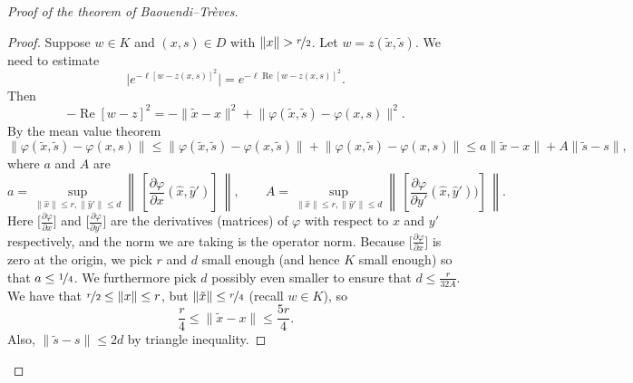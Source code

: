 \documentclass[12pt,openany]{book}
\renewcommand{\Re}{\operatorname{Re}}
\newcommand{\snorm}[1]{\lVert {#1} \rVert}
\newcommand{\babs}[1]{\bigl\lvert {#1} \bigr\rvert}
\newcommand{\norm}[1]{\left\lVert {#1} \right\rVert}
\theoremstyle{plain}
\theoremstyle{remark}
\theoremstyle{definition}
\theoremstyle{exercise}
\theoremstyle{example}
\begin{document}
\begin{proof}[Proof of the theorem of Baouendi--Tr{\`e}ves]
\begin{proof}
Suppose $w \in K$ and $(x,s) \in D$ with $\snorm{x} > \nicefrac{r}{2}$.
Let $w = z(\tilde{x},\tilde{s})$.
We need to estimate
\begin{equation*}
\babs{e^{ -\ell {[w - z(x,s)]}^2 }} =
e^{ -\ell \Re {[w - z(x,s)]}^2 } .
\end{equation*}
Then
\begin{equation*}
-\Re {[w - z]}^2 =
-\snorm{\tilde{x}-x}^2
+
\snorm{\varphi(\tilde{x},\tilde{s})-\varphi(x,s)}^2 .
\end{equation*}
By the mean value theorem
\begin{equation*}
\snorm{\varphi(\tilde{x},\tilde{s})-\varphi(x,s)}
\leq
\snorm{\varphi(\tilde{x},\tilde{s})-\varphi(x,\tilde{s})}
+
\snorm{\varphi(x,\tilde{s})-\varphi(x,s)}
\leq
a \snorm{\tilde{x}-x}
+
A \snorm{\tilde{s}-s} ,
\end{equation*}
where $a$ and $A$ are
\begin{equation*}
a = \sup_{\snorm{\hat{x}} \leq r, \snorm{\hat{y}'} \leq d}
\norm{\,\left[\frac{\partial \varphi}{\partial x}(\hat{x},\hat{y}')\right]\,},
\qquad
A = \sup_{\snorm{\hat{x}} \leq r, \snorm{\hat{y}'} \leq d}
\norm{\,\left[\frac{\partial \varphi}{\partial y'}(\hat{x},\hat{y}'))\right]\,}.
\end{equation*}
Here $\bigl[ \frac{\partial \varphi}{\partial x} \bigr]$ and
$\bigl[ \frac{\partial \varphi}{\partial y'} \bigr]$ are
the derivatives (matrices) of $\varphi$ with respect to $x$ and $y'$
respectively, and the norm we are taking is the operator norm.
Because $\bigl[ \frac{\partial \varphi}{\partial x} \bigr]$ is zero
at the origin, we pick $r$ and $d$ small
enough (and hence $K$ small enough) so that $a \leq \nicefrac{1}{4}$.
We furthermore pick $d$ possibly even smaller to ensure
that $d \leq \frac{r}{32A}$.  We have that $\nicefrac{r}{2} \leq \snorm{x} \leq
r$, but $\snorm{\tilde{x}} \leq \nicefrac{r}{4}$ (recall $w \in K$), so
\begin{equation*}
\frac{r}{4} \leq \snorm{\tilde{x}-x} \leq \frac{5r}{4} .
\end{equation*}
Also, $\snorm{\tilde{s}-s} \leq 2d$ by triangle inequality.


\end{proof}
\end{proof}
\end{document}
